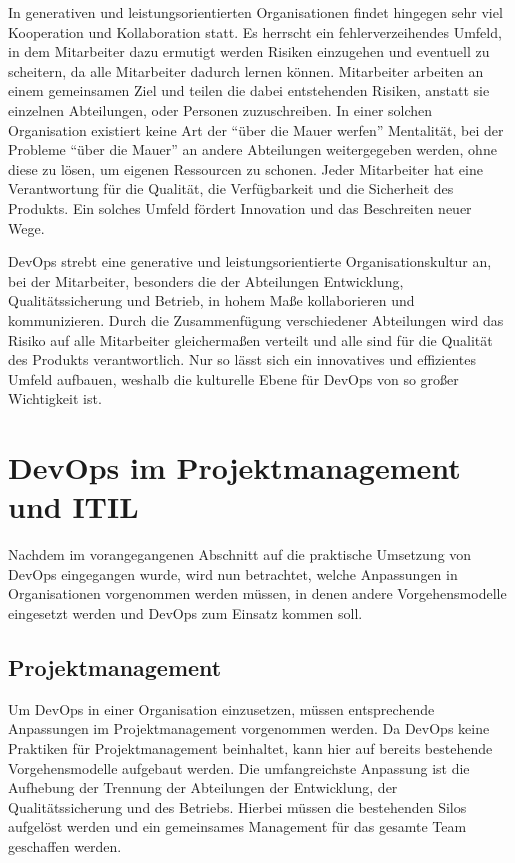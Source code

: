 In generativen und leistungsorientierten Organisationen findet hingegen sehr viel Kooperation und Kollaboration statt. 
Es herrscht ein fehlerverzeihendes Umfeld, in dem Mitarbeiter dazu ermutigt werden Risiken einzugehen und eventuell zu scheitern, da alle Mitarbeiter dadurch lernen können. 
Mitarbeiter arbeiten an einem gemeinsamen Ziel und teilen die dabei entstehenden Risiken, anstatt sie einzelnen Abteilungen, oder Personen zuzuschreiben. In einer solchen Organisation existiert keine Art der \enquote{über die Mauer werfen} Mentalität, bei der Probleme \enquote{über die Mauer} an andere Abteilungen weitergegeben werden, ohne diese zu lösen, um eigenen Ressourcen zu schonen. 
Jeder Mitarbeiter hat eine Verantwortung für die Qualität, die Verfügbarkeit und die Sicherheit des Produkts. 
Ein solches Umfeld fördert Innovation und das Beschreiten neuer Wege. \parencite[vgl.][S. 2]{westrum:2004}

DevOps strebt eine generative und leistungsorientierte Organisationskultur an, bei der Mitarbeiter, besonders die der Abteilungen Entwicklung, Qualitätssicherung und Betrieb, in hohem Maße kollaborieren und kommunizieren. 
Durch die Zusammenfügung verschiedener Abteilungen wird das Risiko auf alle Mitarbeiter gleichermaßen verteilt und alle sind für die Qualität des Produkts verantwortlich.
Nur so lässt sich ein innovatives und effizientes Umfeld aufbauen, weshalb die kulturelle Ebene für DevOps von so großer Wichtigkeit ist.

\section{DevOps im Projektmanagement und ITIL} %
Nachdem im vorangegangenen Abschnitt auf die praktische Umsetzung von DevOps eingegangen wurde, wird nun betrachtet, welche Anpassungen in Organisationen vorgenommen werden müssen, in denen andere Vorgehensmodelle eingesetzt werden und DevOps zum Einsatz kommen soll.

\subsection{Projektmanagement}
Um DevOps in einer Organisation einzusetzen, müssen entsprechende Anpassungen im Projektmanagement vorgenommen werden. 
Da DevOps keine Praktiken für Projektmanagement beinhaltet, kann hier auf bereits bestehende Vorgehensmodelle aufgebaut werden.
Die umfangreichste Anpassung ist die Aufhebung der Trennung der Abteilungen der Entwicklung, der Qualitätssicherung und des Betriebs. 
Hierbei müssen die bestehenden Silos aufgelöst werden und ein gemeinsames Management für das gesamte Team geschaffen werden.
 

